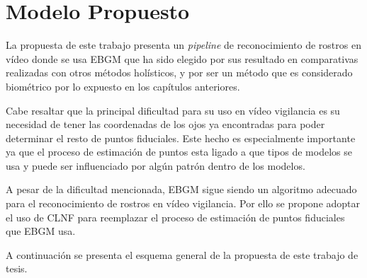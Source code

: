 \chapter{Modelo Propuesto} \label{chap:Propuesta}

La propuesta de este trabajo presenta un \textit{pipeline} de reconocimiento de rostros en vídeo donde se usa \ac{EBGM} que ha sido elegido por sus resultado en comparativas realizadas con otros métodos holísticos, y por ser un método que es considerado biométrico por lo expuesto en los capítulos anteriores.

Cabe resaltar que la principal dificultad para su uso en vídeo vigilancia es su necesidad de tener las coordenadas de los ojos ya encontradas para poder determinar el resto de puntos fiduciales. Este hecho es especialmente importante ya que el proceso de estimación de puntos esta ligado a que tipos de modelos se usa y puede ser influenciado por algún patrón dentro de los modelos.

A pesar de la dificultad mencionada, \ac{EBGM} sigue siendo un algoritmo adecuado para el reconocimiento de rostros en vídeo vigilancia. Por ello se propone adoptar el uso de \ac{CLNF} para reemplazar el proceso de estimación de puntos fiduciales que \ac{EBGM} usa.

A continuación se presenta el esquema general de la propuesta de este trabajo de tesis.

